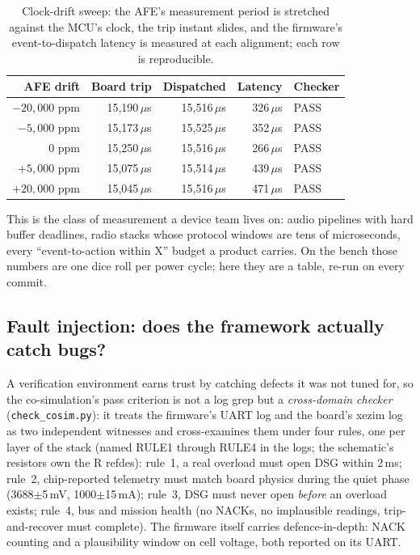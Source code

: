 \documentclass[11pt]{article}
\begin{document}
\begin{table}[htbp]
\centering
\small
\begin{tabular}{@{}rrrrl@{}}
\toprule
AFE drift & Board trip & Dispatched & Latency & Checker \\
\midrule
$-20{,}000$ ppm & 15{,}190\,$\mu$s & 15{,}516\,$\mu$s & 326\,$\mu$s & PASS \\
$-5{,}000$ ppm  & 15{,}173\,$\mu$s & 15{,}525\,$\mu$s & 352\,$\mu$s & PASS \\
$0$ ppm         & 15{,}250\,$\mu$s & 15{,}516\,$\mu$s & 266\,$\mu$s & PASS \\
$+5{,}000$ ppm  & 15{,}075\,$\mu$s & 15{,}514\,$\mu$s & 439\,$\mu$s & PASS \\
$+20{,}000$ ppm & 15{,}045\,$\mu$s & 15{,}516\,$\mu$s & 471\,$\mu$s & PASS \\
\bottomrule
\end{tabular}
\caption{Clock-drift sweep: the AFE's measurement period is
stretched against the MCU's clock, the trip instant slides, and the
firmware's event-to-dispatch latency is measured at each alignment;
each row is reproducible.}
\label{tab:drift}
\end{table}

This is the class of measurement a device team lives on: audio
pipelines with hard buffer deadlines, radio stacks whose protocol
windows are tens of microseconds, every ``event-to-action within
X'' budget a product carries.  On the bench those numbers are one
dice roll per power cycle; here they are a table, re-run on every
commit.

\subsection{Fault injection: does the framework actually catch bugs?}
\label{sec:faults}

A verification environment earns trust by catching defects it was not
tuned for, so the co-simulation's pass criterion is not a log grep
but a \emph{cross-domain checker} (\texttt{check\_cosim.py}): it
treats the firmware's UART log and the board's xezim log as two
independent witnesses and cross-examines them under four rules, one
per layer of the stack (named RULE1 through RULE4 in the logs; the
schematic's resistors own the R refdes): rule~1, a real overload
must open DSG within
2\,ms; rule~2, chip-reported telemetry must match board physics during
the quiet phase (3688$\pm$5\,mV, 1000$\pm$15\,mA); rule~3, DSG must never
open \emph{before} an overload exists; rule~4, bus and mission health (no
NACKs, no implausible readings, trip-and-recover must complete).  The
firmware itself carries defence-in-depth: NACK counting and a
plausibility window on cell voltage, both reported on its UART.
\end{document}
